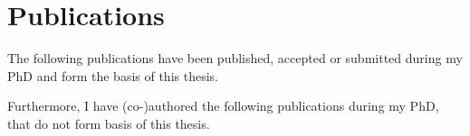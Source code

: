 {}
\chapter*{Publications}%
The following publications have been published, accepted or submitted during my PhD and form the basis of this thesis.


\begin{refsection}[ownpubs]
    \small
    \nocite{Olesen2018c,Stephansen2018,Olesen2019,Olesen2020AutomaticSetting, Olesen2020DeepDetection}
    \printbibliography[heading=none]
\end{refsection}

Furthermore, I have (co-)authored the following publications during my PhD, that do not form basis of this thesis.

\begin{refsection}[ownpubs]
    \small
    \nocite{Olesen2018, Olesen2018a, Olesen2019a, Jacobsen2018, Carvelli2018, Cesari2018, Carvelli2020, Brink-Kjaer2018, Brink-Kjaer2019, Klok2018}
    \printbibliography[heading=none]
\end{refsection}

